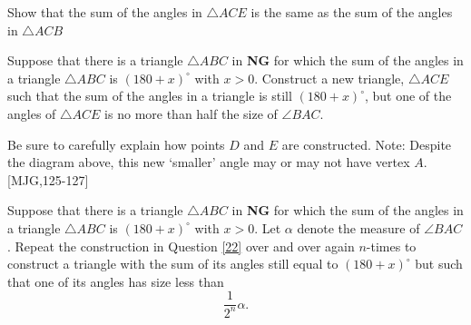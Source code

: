 \documentclass{ximera}
\begin{document}
\begin{question}\label{20}
Show that the sum of the angles in $\triangle ACE$ is the same as the
sum of the angles in $\triangle ACB$
\begin{image}
\end{image}
\end{question}

\begin{question}\label{22} 
Suppose that there is a triangle $\triangle ABC$ in
\textbf{NG} for which the sum of the angles in a triangle $\triangle ABC$ is
$\left( 180+x\right)^\circ$ with $x>0$. Construct a new triangle,
$\triangle ACE$ such that the sum of the angles in a triangle is still
$\left( 180+x\right)^\circ$, but one of the angles of $\triangle ACE$
is no more than half the size of $\angle BAC$.
\begin{image}
\end{image}
Be sure to carefully explain how points $D$ and $E$ are constructed.
Note: Despite the diagram above, this new `smaller' angle may or may
not have vertex $A$. [MJG,125-127]
\end{question}

\begin{question}
\label{21} Suppose that there is a triangle $\triangle ABC$ in
\textbf{NG} for which the sum of the angles in a triangle $\triangle ABC$ is
$\left( 180+x\right)^\circ$ with $x>0$. Let $\alpha$ denote the
measure of $\angle BAC$. Repeat the construction in Question \ref{22}
over and over again $n$-times to construct a triangle with the sum of
its angles still equal to $\left( 180+x\right)^\circ$ but such that
one of its angles has size less than%
\[
\frac{1}{2^{n}}\alpha.
\]
\end{question}
\end{document}
